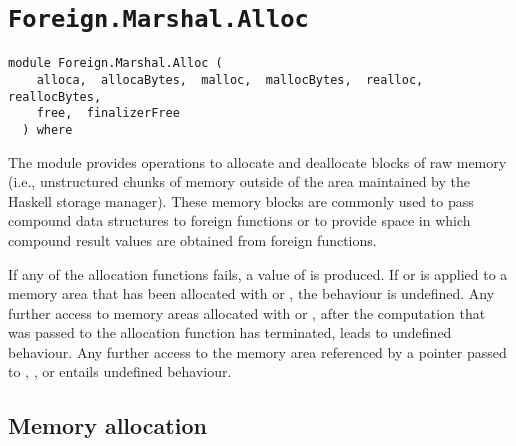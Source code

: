 \chapter{\texttt{Foreign.Marshal.Alloc}}
\label{module:Foreign.Marshal.Alloc}
\haddockbeginheader
{\haddockverb\begin{verbatim}
module Foreign.Marshal.Alloc (
    alloca,  allocaBytes,  malloc,  mallocBytes,  realloc,  reallocBytes, 
    free,  finalizerFree
  ) where\end{verbatim}}
\haddockendheader

The module  provides operations to allocate and
deallocate blocks of raw memory (i.e., unstructured chunks of memory
outside of the area maintained by the Haskell storage manager).  These
memory blocks are commonly used to pass compound data structures to
foreign functions or to provide space in which compound result values
are obtained from foreign functions.
\par
If any of the allocation functions fails, a value of  is
produced.  If  or  is applied to a memory area
that has been allocated with  or , the
behaviour is undefined.  Any further access to memory areas allocated with
 or , after the computation that was passed to
the allocation function has terminated, leads to undefined behaviour.  Any
further access to the memory area referenced by a pointer passed to
, , or  entails undefined
behaviour.
\par

\section{Memory allocation
}
